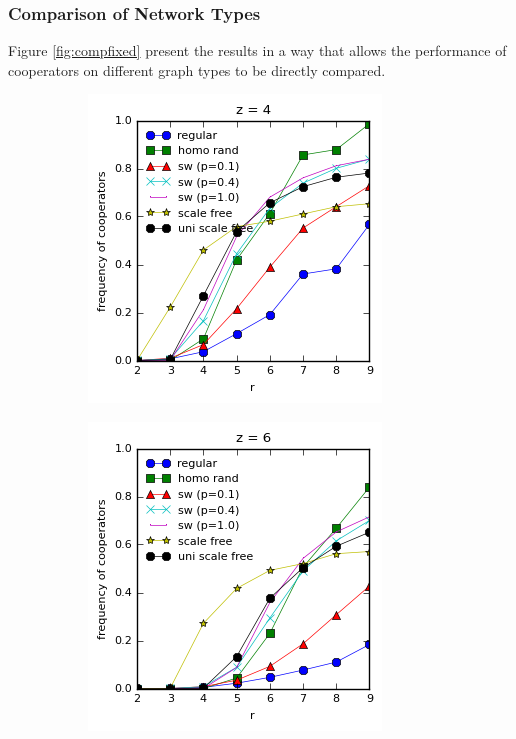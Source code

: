 \documentclass{article}
\begin{document}
	\subsubsection{Comparison of Network Types}
	Figure \ref{fig:compfixed} present the results in a way that allows the performance of cooperators on different graph types to be directly compared.

	\begin{figure}[h]
		\centering
		\begin{subfigure}[b]{0.4\textwidth}
			\includegraphics[width=\textwidth]{fig/fixed/z4all.png}
			\caption{}
		\end{subfigure}
		\begin{subfigure}[b]{0.4\textwidth}
			\includegraphics[width=\textwidth]{fig/fixed/z6all.png}

\end{subfigure}
\end{figure}
\end{document}
